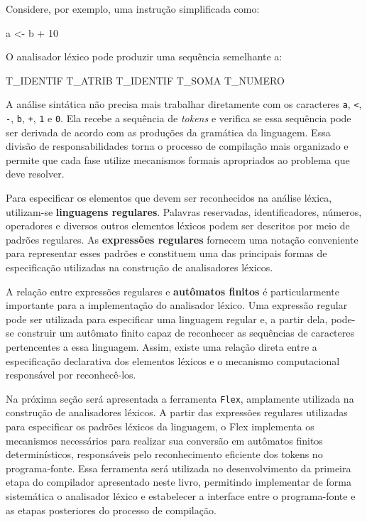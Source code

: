 \documentclass[
  brazilian,
  letterpaper,
]{book}
\newenvironment{Shaded}{\begin{snugshade}}{\end{snugshade}}
\newcommand{\DecValTok}[1]{\textcolor[rgb]{0.68,0.00,0.00}{#1}}
\newcommand{\NormalTok}[1]{\textcolor[rgb]{0.00,0.23,0.31}{#1}}
\theoremstyle{plain}
\theoremstyle{definition}
\theoremstyle{remark}
\begin{document}
Considere, por exemplo, uma instrução simplificada como:

\begin{Shaded}
\begin{Highlighting}[]
\NormalTok{a \textless{}{-} b + }\DecValTok{10}
\end{Highlighting}
\end{Shaded}

O analisador léxico pode produzir uma sequência semelhante a:

\begin{Shaded}
\begin{Highlighting}[]
\NormalTok{T\_IDENTIF  T\_ATRIB  T\_IDENTIF  T\_SOMA  T\_NUMERO}
\end{Highlighting}
\end{Shaded}

A análise sintática não precisa mais trabalhar diretamente com os
caracteres \texttt{a}, \texttt{\textless{}}, \texttt{-}, \texttt{b},
\texttt{+}, \texttt{1} e \texttt{0}. Ela recebe a sequência de
\emph{tokens} e verifica se essa sequência pode ser derivada de acordo
com as produções da gramática da linguagem. Essa divisão de
responsabilidades torna o processo de compilação mais organizado e
permite que cada fase utilize mecanismos formais apropriados ao problema
que deve resolver.

Para especificar os elementos que devem ser reconhecidos na análise
léxica, utilizam-se \textbf{linguagens regulares}. Palavras reservadas,
identificadores, números, operadores e diversos outros elementos léxicos
podem ser descritos por meio de padrões regulares. As \textbf{expressões
regulares} fornecem uma notação conveniente para representar esses
padrões e constituem uma das principais formas de especificação
utilizadas na construção de analisadores léxicos.

A relação entre expressões regulares e \textbf{autômatos finitos} é
particularmente importante para a implementação do analisador léxico.
Uma expressão regular pode ser utilizada para especificar uma linguagem
regular e, a partir dela, pode-se construir um autômato finito capaz de
reconhecer as sequências de caracteres pertencentes a essa linguagem.
Assim, existe uma relação direta entre a especificação declarativa dos
elementos léxicos e o mecanismo computacional responsável por
reconhecê-los.

Na próxima seção será apresentada a ferramenta \texttt{Flex}, amplamente
utilizada na construção de analisadores léxicos. A partir das expressões
regulares utilizadas para especificar os padrões léxicos da linguagem, o
Flex implementa os mecanismos necessários para realizar sua conversão em
autômatos finitos determinísticos, responsáveis pelo reconhecimento
eficiente dos tokens no programa-fonte. Essa ferramenta será utilizada
no desenvolvimento da primeira etapa do compilador apresentado neste
livro, permitindo implementar de forma sistemática o analisador léxico e
estabelecer a interface entre o programa-fonte e as etapas posteriores
do processo de compilação.
\end{document}
